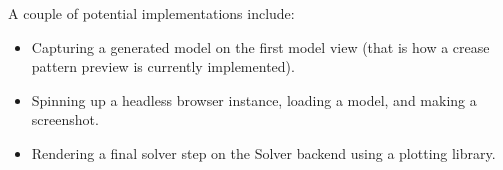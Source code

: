 \medskip


A couple of potential implementations include:

\begin{itemize}
	\item Capturing a generated model on the first model view (that is how a crease pattern preview is currently implemented).
	\item Spinning up a headless browser instance, loading a model, and making a screenshot.
	\item Rendering a final solver step on the Solver backend using a plotting library.
\end{itemize}


